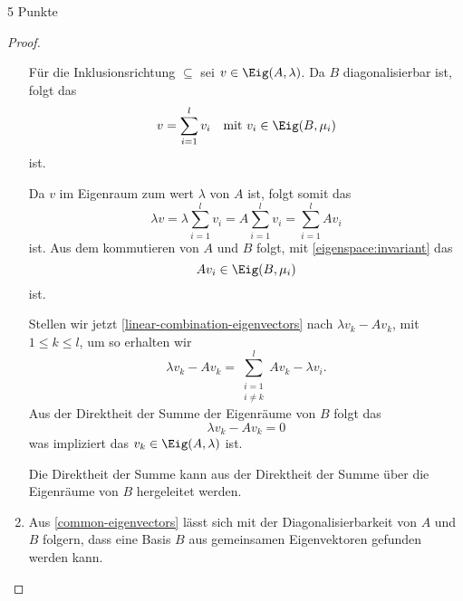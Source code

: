 \documentclass{problemset}
\begin{document}
\begin{problem}{5 Punkte}
\begin{proof}
\begin{enumerate}
              Für die Inklusionsrichtung \(\subseteq\) sei \(v \in \Eig(A, \lambda)\). Da
              \(B\) diagonalisierbar ist, folgt das
              \begin{equation*}
                  v = \sum_{i = 1}^l v_i \quad \text{mit } v_i \in \Eig(B, \mu_i)
              \end{equation*} ist.

              Da \(v\) im Eigenraum zum wert \(\lambda\) von \(A\) ist, folgt somit das
              \begin{equation}
                  \lambda v = \lambda \sum_{i = 1}^l v_i = A \sum_{i = 1}^l v_i = \sum_{i = 1}^l A v_i \label{linear-combination-eigenvectors}
              \end{equation} ist.
              Aus dem kommutieren von \(A\) und \(B\) folgt, mit \autoref{eigenspace:invariant} das
              \begin{equation*}
                  A v_i \in \Eig(B, \mu_i)
              \end{equation*} ist.

              Stellen wir jetzt \autoref{linear-combination-eigenvectors} nach \(\lambda v_k
              - Av_k\), mit \(1 \le k \le l\), um so erhalten wir
              \begin{equation*}
                  \lambda v_k - Av_k = \sum_{\substack{i = 1 \\ i \neq k}}^{l} A v_k - \lambda v_i.
              \end{equation*}
              Aus der Direktheit der Summe der Eigenräume von \(B\) folgt das
              \begin{equation*}
                  \lambda v_k - Av_k = 0
              \end{equation*}
              was impliziert das \(v_k \in \Eig(A, \lambda)\) ist.

              Die Direktheit der Summe kann aus der Direktheit der Summe über die Eigenräume
              von \(B\) hergeleitet werden.

        \item Aus \autoref{common-eigenvectors} lässt sich mit der Diagonalisierbarkeit von
              \(A\) und \(B\) folgern, dass eine Basis \(B\) aus gemeinsamen Eigenvektoren
              gefunden werden kann.


\end{enumerate}
\end{proof}
\end{problem}
\end{document}
